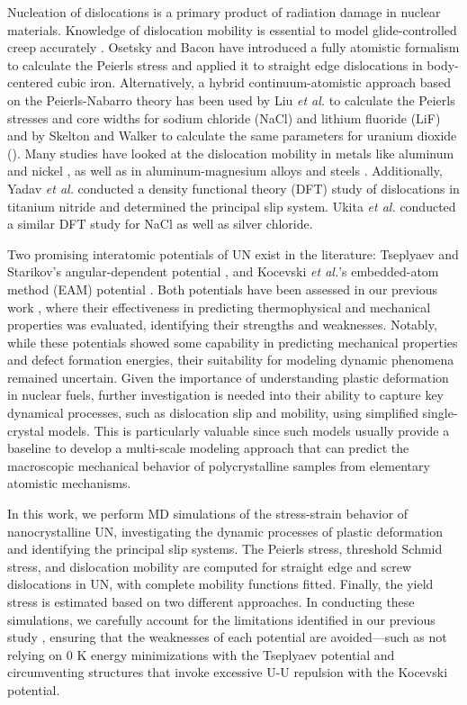 \documentclass[applsci,article,submit,pdftex,moreauthors]{Definitions/mdpi}
\newcommand{\?}{\stackrel{?}{=}}
\begin{document}
Nucleation of dislocations is a primary product of radiation damage in nuclear materials. Knowledge of dislocation mobility is essential to model glide-controlled creep accurately \cite{Skelton2017}. Osetsky and Bacon \cite{Osetsky2003} have introduced a fully atomistic formalism to calculate the Peierls stress and applied it to straight edge dislocations in body-centered cubic iron. Alternatively, a hybrid continuum-atomistic approach based on the Peierls-Nabarro theory has been used by Liu \textit{et al.} \cite{Liu2012} to calculate the Peierls stresses and core widths for sodium chloride (NaCl) and lithium fluoride (LiF) and by Skelton and Walker \cite{Skelton2017} to calculate the same parameters for uranium dioxide (). Many studies have looked at the dislocation mobility in metals like aluminum \cite{Cho2017, Dang2019} and nickel \cite{Olmsted2005}, as well as in aluminum-magnesium alloys \cite{Olmsted2005} and steels \cite{Kaloni2023}. Additionally, Yadav \textit{et al.} \cite{Yadav2014} conducted a density functional theory (DFT) study of dislocations in titanium nitride and determined the principal slip system. Ukita \textit{et al.} \cite{Ukita2018} conducted a similar DFT study for NaCl as well as silver chloride.

Two promising interatomic potentials of UN exist in the literature: Tseplyaev and Starikov's angular-dependent potential \cite{Tseplyaev2016}, and Kocevski \textit{et al.}'s embedded-atom method (EAM) potential \cite{Kocevski2022II}. Both potentials have been assessed in our previous work \cite{AbdulHameed2024}, where their effectiveness in predicting thermophysical and mechanical properties was evaluated, identifying their strengths and weaknesses. Notably, while these potentials showed some capability in predicting mechanical properties and defect formation energies, their suitability for modeling dynamic phenomena remained uncertain. Given the importance of understanding plastic deformation in nuclear fuels, further investigation is needed into their ability to capture key dynamical processes, such as dislocation slip and mobility, using simplified single-crystal models. This is particularly valuable since such models usually provide a baseline to develop a multi-scale modeling approach that can predict the macroscopic mechanical behavior of polycrystalline samples from elementary atomistic mechanisms.

In this work, we perform MD simulations of the stress-strain behavior of nanocrystalline UN, investigating the dynamic processes of plastic deformation and identifying the principal slip systems. The Peierls stress, threshold Schmid stress, and dislocation mobility are computed for straight edge and screw dislocations in UN, with complete mobility functions fitted. Finally, the yield stress is estimated based on two different approaches. In conducting these simulations, we carefully account for the limitations identified in our previous study \cite{AbdulHameed2024}, ensuring that the weaknesses of each potential are avoided---such as not relying on 0 K energy minimizations with the Tseplyaev potential and circumventing structures that invoke excessive U-U repulsion with the Kocevski potential.
\end{document}
